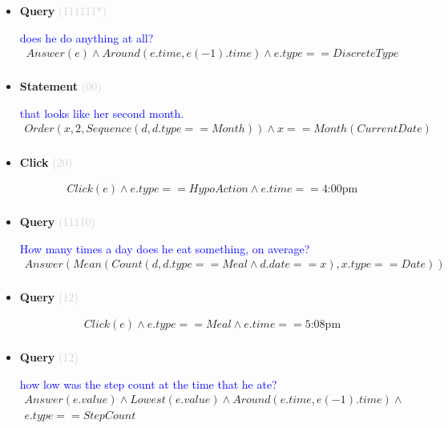 \documentclass[11pt]{article}
\newcommand{\key}[1]{\textcolor{lightgray}{#1}}
\newcounter{CQuery}
\newcounter{CStatement}
\newcounter{CClick}
\begin{document}
\begin{itemize}
\item
\textbf{Query\theCQuery} \key{(111111*)} \addtocounter{CQuery}{1}
\textcolor{blue}{ does he do anything at all? }
\begin{multline*}
Answer(e) \wedge Around(e.time, e(-1).time) \wedge e.type==DiscreteType \\ 
\end{multline*}


\item
\textbf{Statement\theCStatement} \key{(00)} \addtocounter{CStatement}{1}
\textcolor{blue}{ that looks like her second month. }
\begin{multline*}
Order(x, 2, Sequence(d, d.type==Month)) \wedge x==Month(CurrentDate) \\ 
\end{multline*}


\item
\textbf{Click\theCClick} \key{(20)} \addtocounter{CClick}{1}
\textcolor{blue}{  }
\begin{multline*}
Click(e) \wedge e.type==HypoAction \wedge e.time==\mbox{4:00pm} \\ 
\end{multline*}


\item
\textbf{Query\theCQuery} \key{(11110)} \addtocounter{CQuery}{1}
\textcolor{blue}{ How many times a day does he eat something, on average? }
\begin{multline*}
Answer(Mean(Count(d, d.type==Meal \wedge d.date==x), x.type==Date)) \\ 
\end{multline*}


\item
\textbf{Query\theCQuery} \key{(12)} \addtocounter{CQuery}{1}
\textcolor{blue}{  }
\begin{multline*}
Click(e) \wedge e.type == Meal \wedge e.time==\mbox{5:08pm} \\ 
\end{multline*}


\item
\textbf{Query\theCQuery} \key{(12)} \addtocounter{CQuery}{1}
\textcolor{blue}{ how low was the step count at the time that he ate? }
\begin{multline*}
Answer(e.value) \wedge Lowest(e.value) \wedge Around(e.time, e(-1).time) \wedge \\ 
e.type==StepCount \\ 
\end{multline*}



\end{itemize}
\end{document}
